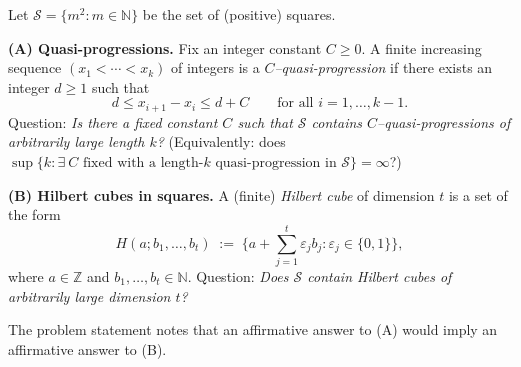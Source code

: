 
Let $\mathcal{S}=\{m^2: m\in\mathbb{N}\}$ be the set of (positive) squares.

\medskip
\noindent\textbf{(A) Quasi-progressions.}
Fix an integer constant $C\ge 0$.  A finite increasing sequence $(x_1<\cdots<x_k)$ of integers is a \emph{$C$--quasi-progression} if there exists an integer $d\ge 1$ such that
\[
 d \le x_{i+1}-x_i \le d+C \qquad\text{for all } i=1,\dots,k-1.
\]
Question: \emph{Is there a fixed constant $C$ such that $\mathcal{S}$ contains $C$--quasi-progressions of arbitrarily large length $k$?}
(Equivalently: does $\sup\{k: \exists\ C\text{ fixed with a length-$k$ quasi-progression in }\mathcal{S}\}=\infty$?)

\medskip
\noindent\textbf{(B) Hilbert cubes in squares.}
A (finite) \emph{Hilbert cube} of dimension $t$ is a set of the form
\[
H(a; b_1,\dots,b_t)\;:=\;\Big\{a+\sum_{j=1}^t \varepsilon_j b_j : \varepsilon_j\in\{0,1\}\Big\},
\]
where $a\in\mathbb{Z}$ and $b_1,\dots,b_t\in\mathbb{N}$.
Question: \emph{Does $\mathcal{S}$ contain Hilbert cubes of arbitrarily large dimension $t$?}

The problem statement notes that an affirmative answer to (A) would imply an affirmative answer to (B).
